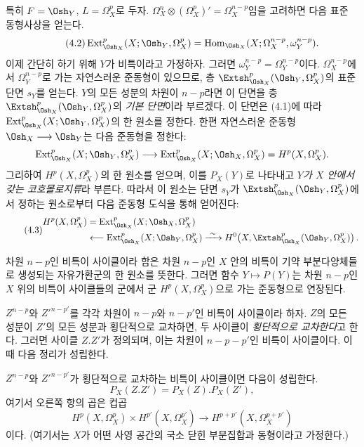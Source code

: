 특히 $F=\Osh_Y$, $L=\Omega_X^{p}$로 두자.
$\Omega_X^{n}\otimes(\Omega_X^{p})'=\Omega_X^{n-p}$임을 고려하면 다음 표준
동형사상을 얻는다.
\begin{equation}\tag{4.2}
  \operatorname{Ext}_{\Osh_X}^{p}(X;\Osh_Y,\Omega_X^{p})
  =\operatorname{Hom}_{\Osh_X}
  (X;\Omega_X^{n-p},\omega_Y^{n-p}).
\end{equation}
이제 간단히 하기 위해 $Y$가 비특이라고 가정하자. 그러면
$\omega_Y^{n-p}=\Omega_Y^{n-p}$이다. $\Omega_X^{n-p}$에서
$\Omega_Y^{n-p}$로 가는 자연스러운 준동형이 있으므로, 층
$\Extsh_{\Osh_X}^{p}(\Osh_Y,\Omega_X^{p})$의 표준 단면 $s_Y$를 얻는다.
$Y$의 모든 성분의 차원이 $n-p$라면 이 단면을 층
$\Extsh_{\Osh_X}^{p}(\Osh_Y,\Omega_X^{p})$의 \emph{기본 단면}이라 부르겠다.
이 단면은 (4.1)에 따라
$\operatorname{Ext}_{\Osh_X}^{p}(X;\Osh_Y,\Omega_X^{p})$의 한 원소를 정한다. 한편
자연스러운 준동형 $\Osh_X\longrightarrow\Osh_Y$는 다음 준동형을 정한다:
\[
  \operatorname{Ext}_{\Osh_X}^{p}(X;\Osh_Y,\Omega_X^{p})
  \longrightarrow
  \operatorname{Ext}_{\Osh_X}^{p}(X;\Osh_X,\Omega_X^{p})
  =H^{p}(X,\Omega_X^{p}).
\]
그리하여 $H^{p}(X,\Omega_X^{p})$의 한 원소를 얻으며, 이를 $P_X(Y)$로 나타내고
\emph{$Y$가 $X$ 안에서 갖는 코호몰로지류}라 부른다. 따라서 이 원소는 단면
$s_Y$가 $\Extsh_{\Osh_X}^{p}(\Osh_Y,\Omega_X^{p})$에서 정하는 원소로부터 다음
준동형 도식을 통해 얻어진다:
\begin{equation}\tag{4.3}
\begin{aligned}
H^{p}(X,\Omega_X^{p})
&=\operatorname{Ext}_{\Osh_X}^{p}(X;\Osh_X,\Omega_X^{p})\\
&\longleftarrow\operatorname{Ext}_{\Osh_X}^{p}(X;\Osh_Y,\Omega_X^{p})
\xrightarrow{\ \sim\ }
H^{0}\!\left(X,\Extsh_{\Osh_X}^{p}(\Osh_Y,\Omega_X^{p})\right).
\end{aligned}
\end{equation}

차원 $n-p$인 비특이 사이클이라 함은 차원 $n-p$인 $X$ 안의 비특이 기약
부분다양체들로 생성되는 자유가환군의 한 원소를 뜻한다. 그러면 함수
$Y\longmapsto P(Y)$는 차원 $n-p$인 $X$ 위의 비특이 사이클들의 군에서
군 $H^{p}(X,\Omega_X^{p})$으로 가는 준동형으로 연장된다.

$Z^{n-p}$와 $Z'^{n-p'}$를 각각 차원이 $n-p$와 $n-p'$인 비특이 사이클이라
하자. $Z$의 모든 성분이 $Z'$의 모든 성분과 횡단적으로 교차하면, 두 사이클이
\emph{횡단적으로 교차한다}고 한다. 그러면 사이클 $Z.Z'$가 정의되며, 이는
차원이 $n-p-p'$인 비특이 사이클이다. 이때 다음 정리가 성립한다.

 $Z^{n-p}$와 $Z'^{n-p'}$가 횡단적으로 교차하는 비특이
사이클이면 다음이 성립한다.
\begin{equation}\tag{4.4}
  P_X(Z.Z')=P_X(Z).P_X(Z'),
\end{equation}
여기서 오른쪽 항의 곱은 컵곱
\[
  H^{p}(X,\Omega_X^{p})\times H^{p'}(X,\Omega_X^{p'})
  \longrightarrow H^{p+p'}(X,\Omega_X^{p+p'})
\]
이다. (여기서는 $X$가 어떤 사영 공간의 국소 닫힌 부분집합과 동형이라고
가정한다.)

